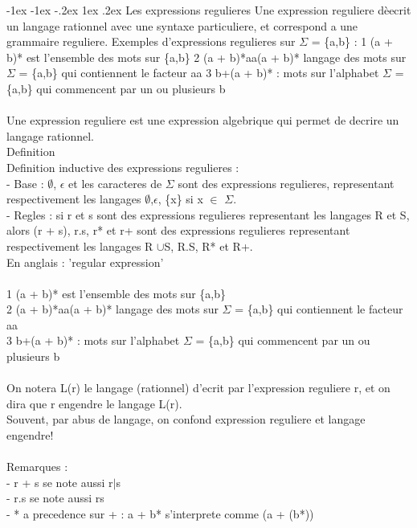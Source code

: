 \documentclass[5pt]{article}
\makeatletter
\renewcommand{\subsubsection}{\@startsection {section}{1}{\z@}%
             {-1ex \@plus -1ex \@minus -.2ex}%
             {1ex \@plus.2ex}%
             {\normalfont\scriptsize\sffamily\bfseries}}
\makeatother
\begin{document}
\begin{scriptsize}
\subsubsection{Les expressions regulieres}
Une expression reguliere dèecrit un langage rationnel avec une syntaxe particuliere, et correspond a une grammaire reguliere.
Exemples d’expressions regulieres sur $\Sigma$ = \{a,b\} : 1 (a + b)* est l’ensemble des mots sur \{a,b\} 2 (a + b)*aa(a + b)* langage des mots sur $\Sigma$ = \{a,b\} qui contiennent le facteur aa 3 b+(a + b)* : mots sur l’alphabet $\Sigma$ = \{a,b\} qui commencent par un ou plusieurs b\\
\\
Une expression reguliere est une expression algebrique qui permet de decrire un langage rationnel.\\
Definition\\
Definition inductive des expressions regulieres :\\
- Base : $\emptyset$, $\epsilon$ et les caracteres de $\Sigma$ sont des expressions regulieres, representant respectivement les langages $\emptyset$,{$\epsilon$}, \{x\} si x $\in$ $\Sigma$.\\
- Regles : si r et s sont des expressions regulieres representant les langages R et S, alors (r + s), r.s, r* et r+ sont des expressions regulieres representant respectivement les langages R $\cup$S, R.S, R* et R+.\\
En anglais : ’regular expression’\\
\\
1 (a + b)* est l’ensemble des mots sur \{a,b\}\\
2 (a + b)*aa(a + b)* langage des mots sur $\Sigma$ = \{a,b\} qui contiennent le facteur aa\\
3 b+(a + b)* : mots sur l’alphabet $\Sigma$ = \{a,b\} qui commencent par un ou plusieurs b\\
\\
On notera L(r) le langage (rationnel) d'ecrit par l’expression reguliere r, et on dira que r engendre le langage L(r).\\
Souvent, par abus de langage, on confond expression reguliere et langage engendre!\\
\\
Remarques :\\
- r + s se note aussi r$\mid$s\\
- r.s se note aussi rs\\
- * a precedence sur + : a + b* s’interprete comme (a + (b*))\\

\end{scriptsize}
\end{document}
